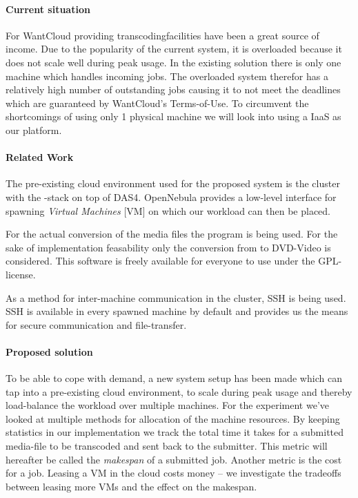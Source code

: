 \paragraph{Current situation}
For WantCloud providing transcoding\footnotemark facilities have been
a great source of income. Due to the popularity of the current system,
it is overloaded because it does not scale well during peak usage. In
the existing solution there is only one machine which handles incoming
jobs. The overloaded system therefor has a relatively high number of
outstanding jobs causing it to not meet the deadlines which are
guaranteed by WantCloud's Terms-of-Use. To circumvent the shortcomings
of using only 1 physical machine we will look into using a IaaS as our
platform.

\paragraph{Related Work}
The pre-existing cloud environment used for the proposed system is the
\cite{DAS4} cluster with the \cite{OpenNebula}-stack on top of
DAS4. OpenNebula provides a low-level interface for spawning
\emph{Virtual Machines} [VM] on which our workload can then be
placed. 

For the actual conversion of the media files the \cite{FFmpeg} program
is being used. For the sake of implementation feasability only the
conversion from \cite{H264} to DVD-Video is considered. This software
is freely available for everyone to use under the GPL-license.

As a method for inter-machine communication in the cluster, SSH is
being used. SSH is available in every spawned machine by default and
provides us the means for secure communication and file-transfer.

\paragraph{Proposed solution}
To be able to cope with demand, a new system setup has been made which
can tap into a pre-existing cloud environment, to scale during peak
usage and thereby load-balance the workload over multiple
machines. For the experiment we've looked at multiple methods for
allocation of the machine resources. By keeping statistics in our
implementation we track the total time it takes for a submitted
media-file to be transcoded and sent back to the submitter. This
metric will hereafter be called the \emph{makespan} of a submitted
job. Another metric is the cost for a job. Leasing a VM in the cloud
costs money -- we investigate the tradeoffs between leasing more VMs
and the effect on the makespan.  

